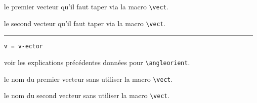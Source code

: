 \documentclass[12pt,a4paper]{article}
\newcommand\env[1]{\texttt{#1}}
\newcommand\macro[1]{\env{\textbackslash{}#1}}
\theoremstyle{definition}
\newcommand\separation{
	\medskip
	\hfill\rule{0.5\textwidth}{0.75pt}\hfill
	\medskip
}
\newcommand\mwhyprefix[2]{%
	\texttt{#1 = #1-#2}%
}
\begin{document}
 le premier vecteur qu'il faut taper via la macro \macro{vect}.

 le second vecteur qu'il faut taper via la macro \macro{vect}.


\separation


 \hfill \mwhyprefix{v}{ector}

\IDoption{} voir les explications précédentes données pour \macro{angleorient}.

 le nom du premier vecteur sans utiliser la macro \macro{vect}.

 le nom du second vecteur sans utiliser la macro \macro{vect}.
\end{document}
